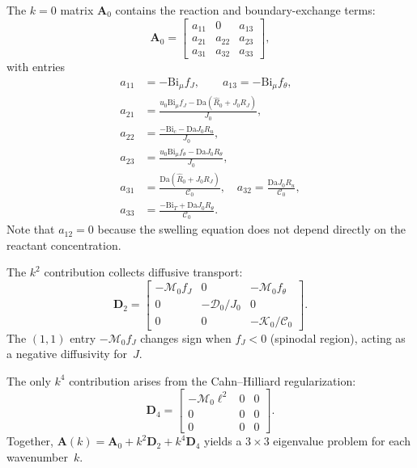\documentclass[aps,pre,reprint,superscriptaddress,longbibliography,floatfix]{revtex4-2}
\newcommand{\Ms}{\mathcal{M}}
\newcommand{\Ds}{\mathcal{D}}
\newcommand{\Cs}{\mathcal{C}}
\newcommand{\Ks}{\mathcal{K}}
\newcommand{\Da}{\mathrm{Da}}
\newcommand{\Bi}{\mathrm{Bi}}
\newcommand{\Rhat}{\widehat{R}}
\begin{document}
The $k=0$ matrix $\mathbf A_0$ contains the reaction and
boundary-exchange terms:
\begin{equation}
  \mathbf A_0 =
  \begin{bmatrix}
    a_{11} & 0 & a_{13} \\
    a_{21} & a_{22} & a_{23} \\
    a_{31} & a_{32} & a_{33}
  \end{bmatrix},
  \label{eq:A0}
\end{equation}
with entries
\begin{subequations}
\label{eq:A0_entries}
\begin{align}
  a_{11} &= -\Bi_\mu f_J, \qquad
  a_{13} = -\Bi_\mu f_\theta, \\
  a_{21} &= \frac{u_0\Bi_\mu f_J
             - \Da(\Rhat_0 + J_0R_J)}{J_0}, \\
  a_{22} &= \frac{-\Bi_c - \Da J_0 R_u}{J_0}, \\
  a_{23} &= \frac{u_0\Bi_\mu f_\theta
             - \Da J_0 R_\theta}{J_0}, \\
  a_{31} &= \frac{\Da(\Rhat_0 + J_0R_J)}{\Cs_0}, \quad
  a_{32} = \frac{\Da J_0 R_u}{\Cs_0}, \\
  a_{33} &= \frac{-\Bi_T + \Da J_0R_\theta}{\Cs_0}.
\end{align}
\end{subequations}
Note that $a_{12}=0$ because the swelling equation does not depend
directly on the reactant concentration.

The $k^2$ contribution collects diffusive transport:
\begin{equation}
  \mathbf D_2 =
  \begin{bmatrix}
    -\Ms_0 f_J & 0 & -\Ms_0 f_\theta \\
    0 & -\Ds_0/J_0 & 0 \\
    0 & 0 & -\Ks_0/\Cs_0
  \end{bmatrix}.
  \label{eq:D2}
\end{equation}
The $(1,1)$ entry $-\Ms_0 f_J$ changes sign when $f_J<0$ (spinodal
region), acting as a negative diffusivity for~$J$.

The only $k^4$ contribution arises from the Cahn--Hilliard
regularization:
\begin{equation}
  \mathbf D_4 =
  \begin{bmatrix}
    -\Ms_0\ell^2 & 0 & 0 \\
    0 & 0 & 0 \\
    0 & 0 & 0
  \end{bmatrix}.
  \label{eq:D4}
\end{equation}
Together, $\mathbf A(k) = \mathbf A_0 + k^2\mathbf D_2 +
k^4\mathbf D_4$ yields a $3\times 3$ eigenvalue problem for each
wavenumber~$k$.
\end{document}
